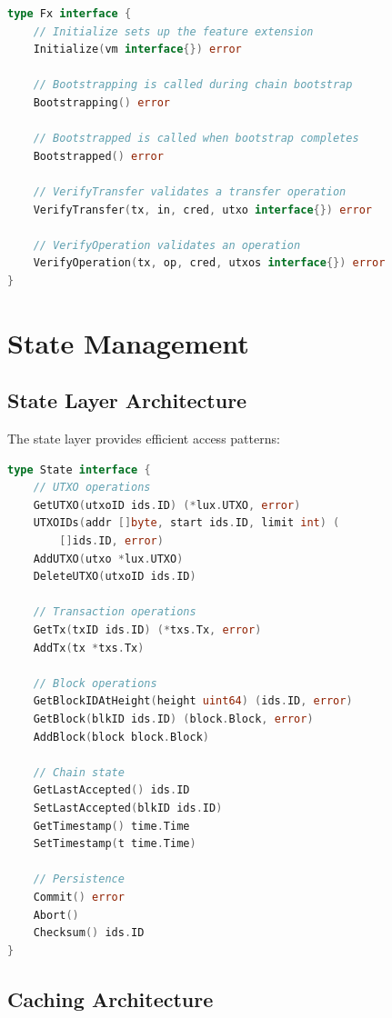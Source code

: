 \documentclass[11pt,a4paper]{article}
\begin{document}
\begin{lstlisting}[language=Go,caption={Feature Extension Interface}]
type Fx interface {
    // Initialize sets up the feature extension
    Initialize(vm interface{}) error

    // Bootstrapping is called during chain bootstrap
    Bootstrapping() error

    // Bootstrapped is called when bootstrap completes
    Bootstrapped() error

    // VerifyTransfer validates a transfer operation
    VerifyTransfer(tx, in, cred, utxo interface{}) error

    // VerifyOperation validates an operation
    VerifyOperation(tx, op, cred, utxos interface{}) error
}
\end{lstlisting}

\section{State Management}

\subsection{State Layer Architecture}

The state layer provides efficient access patterns:

\begin{lstlisting}[language=Go,caption={State Interface}]
type State interface {
    // UTXO operations
    GetUTXO(utxoID ids.ID) (*lux.UTXO, error)
    UTXOIDs(addr []byte, start ids.ID, limit int) (
        []ids.ID, error)
    AddUTXO(utxo *lux.UTXO)
    DeleteUTXO(utxoID ids.ID)

    // Transaction operations
    GetTx(txID ids.ID) (*txs.Tx, error)
    AddTx(tx *txs.Tx)

    // Block operations
    GetBlockIDAtHeight(height uint64) (ids.ID, error)
    GetBlock(blkID ids.ID) (block.Block, error)
    AddBlock(block block.Block)

    // Chain state
    GetLastAccepted() ids.ID
    SetLastAccepted(blkID ids.ID)
    GetTimestamp() time.Time
    SetTimestamp(t time.Time)

    // Persistence
    Commit() error
    Abort()
    Checksum() ids.ID
}
\end{lstlisting}

\subsection{Caching Architecture}
\end{document}
